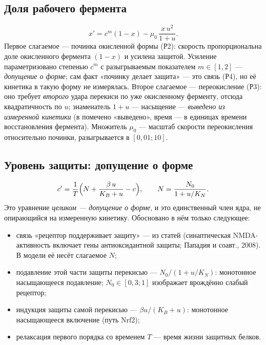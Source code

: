 \documentclass[11pt,a4paper]{article}
\theoremstyle{remark}
\newcommand{\code}[1]{\texttt{\detokenize{#1}}}
\begin{document}
\subsection{Доля рабочего фермента}
\begin{equation}\label{eq:x}
x' = c^{m}(1-x) - \mu_0\,\frac{x\,u^2}{1+u}.
\end{equation}
Первое слагаемое --- починка окисленной формы (Р2): скорость пропорциональна доле
окисленного фермента $(1-x)$ и усилена защитой. Усиление параметризовано степенью
$c^{m}$ с разыгрываемым показателем $m\in[1,2]$ --- \emph{допущение о форме}; сам факт
«починку делает защита» --- это связь (Р4), но её кинетика в такую форму не измерялась.
Второе слагаемое --- переокисление (Р3): оно требует \emph{второго} удара перекиси по
уже окисленному ферменту, отсюда квадратичность по $u$; знаменатель $1+u$ ---
насыщение --- \emph{выведено из измеренной кинетики} (в \code{core_model.py} помечено
«выведено», время --- в единицах времени восстановления фермента). Множитель $\mu_0$ ---
масштаб скорости переокисления относительно починки, разыгрывается в $[0{,}01;10]$.

\subsection{Уровень защиты: допущение о форме}
\begin{equation}\label{eq:c}
c' = \frac{1}{T}\Bigl(N + \frac{\beta\,u}{K_B+u} - c\Bigr),\qquad
N = \frac{N_0}{1+u/K_N}.
\end{equation}
Это уравнение \emph{целиком --- допущение о форме}, и это единственный член ядра, не
опирающийся на измеренную кинетику. Обосновано в нём только следующее:

\begin{itemize}
\item связь «рецептор поддерживает защиту» --- из статей (синаптическая NMDA-активность
включает гены антиоксидантной защиты; Пападия и соавт., 2008). В модели её несёт
слагаемое $N$;
\item подавление этой части защиты перекисью --- $N_0/(1+u/K_N)$: монотонное насыщающееся
подавление; $N_0\in[0{,}3;1]$ изображает врождённо слабый рецептор;
\item индукция защиты самой перекисью --- $\beta u/(K_B+u)$: монотонное насыщающееся
включение (путь Nrf2);
\item релаксация первого порядка со временем $T$ --- время жизни защитных белков.
\end{itemize}
\end{document}

